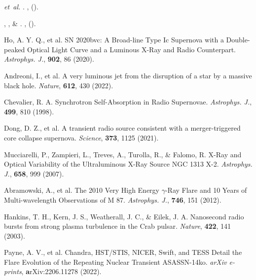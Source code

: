 \documentclass{nature_plusfigure}
\newcommand{\apj}{{Astrophys. J.}}
\newcommand{\nat}{{Nature}}
\newcommand{\araa}{Annual Review of Astronomy and Astrophysics}
\begin{document}
\begin{thebibliography}{100}
 \emph{et~al.}
\newblock {}.
\newblock \emph{} \textbf{},
   ().

, ,
   \& 
\newblock {}.
\newblock \emph{\bibinfo{journal}{\apj}} \textbf{},
   ().

 Ho, A. Y. Q., et al. SN 2020bvc: A Broad-line Type Ic Supernova with a Double-peaked Optical Light Curve and a Luminous X-Ray and Radio Counterpart. \emph{\apj}, \textbf{902}, 86 (2020). 

 Andreoni, I., et al. A very luminous jet from the disruption of a star by a massive black hole. \emph{\nat}, \textbf{612}, 430 (2022). 

 
  Chevalier, R. A. Synchrotron Self-Absorption in Radio Supernovae. \emph{\apj}, \textbf{499}, 810 (1998). 
 
   Dong, D. Z., et al. A transient radio source consistent with a merger-triggered core collapse supernova. \emph{Science}, \textbf{373}, 1125 (2021). 
  
 
 Mucciarelli, P., Zampieri, L., Treves, A., Turolla, R., \& Falomo, R. X-Ray and Optical Variability of the Ultraluminous X-Ray Source NGC 1313 X-2. \emph{\apj}, \textbf{658}, 999 (2007). 

 Abramowski, A., et al. The 2010 Very High Energy $\gamma$-Ray Flare and 10 Years of Multi-wavelength Observations of M 87. \emph{\apj}, \textbf{746}, 151 (2012). 

 Hankins, T. H., Kern, J. S., Weatherall, J. C., \& Eilek, J. A. Nanosecond radio bursts from strong plasma turbulence in the Crab pulsar. \emph{\nat}, \textbf{422}, 141 (2003). 

 Payne, A. V., et al. Chandra, HST/STIS, NICER, Swift, and TESS Detail the Flare Evolution of the Repeating Nuclear Transient ASASSN-14ko. \emph{arXiv e-prints}, \textbf arXiv:2206.11278 (2022). 




%
%
%


\end{thebibliography}
\end{document}
